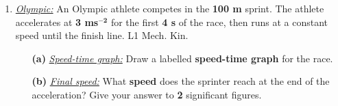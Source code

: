 \documentclass[A4,12pt]{article}
\begin{document}
\begin{enumerate}[label=\bfseries (\arabic*)]
\item \href{https://isaacphysics.org/questions/olympic_sprinter?board=aa9cd909-45d0-45da-921f-d2435c9b3afc}{\it Olympic:} An Olympic athlete competes in the \textbf{100 m} sprint. The athlete accelerates at \textbf{3 ms}$\bm{^{-2}}$ for the first \textbf{4 s} of the race, then runs at a constant speed until the finish line. \cite{Jardine-Wright} L1 Mech. Kin.
\begin{itemize}
    \item[\bf (a)] \href{https://isaacphysics.org/questions/olympic_sprinter?board=aa9cd909-45d0-45da-921f-d2435c9b3afc}{\it Speed-time graph:} Draw a labelled \textbf{speed-time graph} for the race.
    \item[\bf (b)] \href{https://isaacphysics.org/questions/olympic_sprinter?board=aa9cd909-45d0-45da-921f-d2435c9b3afc}{\it Final speed:} What \textbf{speed} does the sprinter reach at the end of the acceleration? Give your answer to \textbf{2} significant figures.

\end{itemize}
\end{enumerate}
\end{document}
